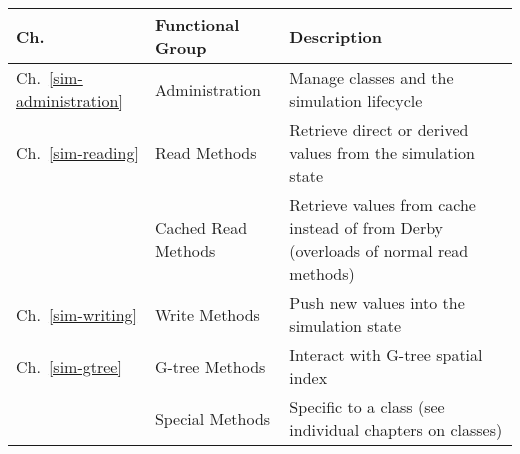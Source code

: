 \begin{tabular}{|l|l|p{100mm}|}
\hline
Ch. & Functional Group & Description \\
\hline
Ch.~\ref{sim-administration} & Administration & Manage classes and the simulation lifecycle \\
Ch.~\ref{sim-reading} & Read Methods & Retrieve direct or derived values from the simulation state \\
& Cached Read Methods & Retrieve values from cache instead of from Derby (overloads of normal read methods) \\
Ch.~\ref{sim-writing} & Write Methods & Push new values into the simulation state \\
Ch.~\ref{sim-gtree} & G-tree Methods & Interact with G-tree spatial index \\
& Special Methods & Specific to a class (see individual chapters on classes)\\
\hline
\end{tabular}
